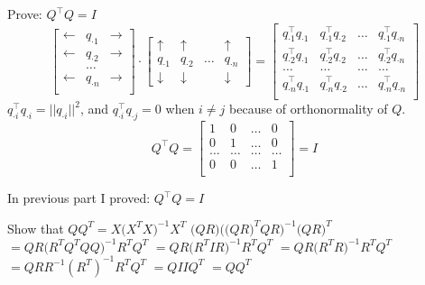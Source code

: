 \documentclass[12pt]{article}
\begin{document}
\begin{enumerate}
Prove: $Q^\top Q =I$ \\

$$
\begin{bmatrix}
\leftarrow & q_{\cdot 1} & \rightarrow\\
\leftarrow & q_{\cdot 2} & \rightarrow \\
 & \dots &  \\
 \leftarrow & q_{\cdot n} & \rightarrow\\
\end{bmatrix}
\cdot 
\begin{bmatrix}
\uparrow & \uparrow &  & \uparrow \\
q_{\cdot 1} & q_{\cdot 2} & \dots & q_{\cdot n}\\
\downarrow & \downarrow & & \downarrow
\end{bmatrix}
=
\begin{bmatrix}
q_{\cdot 1}^\top q_{\cdot 1} & q_{\cdot 1}^\top q_{\cdot 2} & \dots & q_{\cdot 1}^\top q_{\cdot n} \\
q_{\cdot 2}^\top q_{\cdot 1} & q_{\cdot 2}^\top q_{\cdot 2} & \dots & q_{\cdot 2}^\top q_{\cdot n} \\
\dots & \dots & \dots & \dots  \\
q_{\cdot n}^\top q_{\cdot 1} & q_{\cdot n}^\top q_{\cdot 2} & \dots & q_{\cdot n}^\top q_{\cdot n} \\
\end{bmatrix}$$
$q_{\cdot i}^\top q_{\cdot i} = \vert \vert q_{\cdot i} \vert \vert ^2$,   and $q_{\cdot i}^\top q_{\cdot j} = 0$ when $i \neq j$ because of orthonormality of $Q$. \\
$$ Q^\top Q= \begin{bmatrix}
1 & 0 & \dots & 0 \\
0 & 1 & \dots & 0 \\
\dots & \dots & \dots & \dots  \\
0 & 0 & \dots & 1 \\
\end{bmatrix}
=I$$



In previous part I proved: $Q^\top Q = I$ \newline 

Show that $QQ^T = X \big( X^T X \big)^{-1} X^T$ \newline 
$\big( QR \big) \Big( \big(QR \big)^T QR \Big)^{-1} \big( QR\big)^T$ \newline 
$ = QR \big( R^TQ^T Q Q)^{-1}R^TQ^T$ \newline 
$ = QR \big(R^T I R \big)^{-1} R^T Q^T$ \newline 
$ = QR \big(R^T R \big)^{-1} R^T Q^T$ \newline 
$ = QR R^{-1} (R^T)^{-1} R^T Q^T$ \newline 
$ = Q I IQ^T$ \newline 
$ = QQ^T$ 


\end{enumerate}
\end{document}
